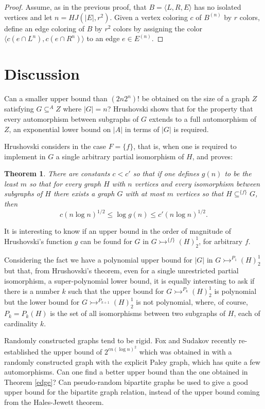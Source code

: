 \documentclass[11pt]{amsart}
\newcommand{\ars}{\rightarrowtail}
\newcommand{\rng}{\rangle}
\newcommand{\lng}{\langle}
\newcommand{\su}{\subseteq}
\newtheorem*{abstheorem}{Theorem}
\begin{document}
\begin{proof}
  Assume, as in the previous proof, that $B=\lng L,R,E\rng$ has no
  isolated vertices and let $n=HJ(|E|,r^2)$. Given a vertex coloring
  $c$ of $B^{(n)}$ by $r$ colors, define an edge coloring of $B$ by
$r^2$
  colors by assigning the color $\lng c(e\cap L^n),c(e\cap R^n)\rng$
to an
  edge $e\in E^{(n)}$.
\end{proof}

\section{Discussion}
Can a smaller upper bound than $(2n2^n)!$ be obtained on the size
of a graph $Z$ satisfying $G\su^A Z$ where $|G|=n$?  Hrushovski
\cite{H} shows that for the property that every automorphism
between subgraphs of $G$ extends to a full automorphism of $Z$,
an exponential lower bound on $|A|$ in terms of $|G|$ is required.

Hrushovski considers in \cite{H} the case $F=\{f\}$, that is,
when one is required to implement in $G$ a single arbitrary
partial isomorphism of $H$, and proves:

\begin{abstheorem} There are constants $c<c'$ so that if one defines
  $g(n)$ to be the least $m$ so that for every graph $H$ with $n$
  vertices and every isomorphism between subgraphs of $H$ there exists
  a graph $G$ with at most $m$ vertices so that $H\su^{\{f\}}G$, then
\[c(n\log n)^{1/2}\le \log g(n) \le c'(n\log n)^{1/2}.\]
\end{abstheorem}

It is interesting to know if an upper bound in the order of magnitude
of Hrushovski's function $g$ can be found for $G$ in
$G\ars^{\{f\}}(H)^1_2$, for arbitrary $f$.

Considering the fact we have a polynomial upper bound for $|G|$ in
$G\ars^{P_1}(H)^1_2$ but that, from Hrushovski's theorem, even for a
single unrestricted partial isomorphism, a super-polynomial lower
bound, it is equally interesting to ask if there is
a number $k$ such that the upper bound for $G\ars^{P_k}(H)^1_2$ is
polynomial but the lower bound for $G\ars^{P_{k+1}}(H)^1_2$ is not
polynomial, where, of course, $P_k=P_{k}(H)$ is the set of all
isomorphisms between two subgraphs of $H$, each of cardinality
$k$.

Randomly constructed graphs tend to be rigid. Fox and Sudakov
\cite{FS} recently re-established the upper bound of $2^{cn(\log
  n)^2}$ which was obtained in \cite{KPR} with a randomly constructed
graph with the explicit Paley graph, which has quite a few
automorphisms.  Can one find a better upper bound than the one
obtained in Theorem \ref{edge}?  Can pseudo-random bipartite graphs be
used to give a good upper bound for the bipartite graph relation,
instead of the upper bound coming from the Hales-Jewett theorem.
\end{document}
